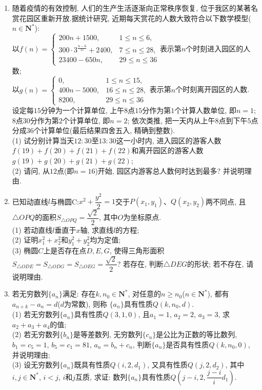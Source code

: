 \documentclass[10pt,a4paper]{article}
\begin{document}
\begin{enumerate}[1.]
\item 随着疫情的有效控制, 人们的生产生活逐渐向正常秩序恢复, 位于我区的某著名赏花园区重新开放.据统计研究, 近期每天赏花的人数大致符合以下数学模型($n\in \mathbf{N}^*$):\\
以$f(n)=\begin{cases}
200n+1500, & 1\le n\le 6,  \\ 300\cdot 3^{\frac{n-6}{11}}+2400, & 7\le n\le 28,  \\ 23400-650n, & 29\le n\le 36 \end{cases}$表示第$n$个时刻进入园区的人数;\\
以$g(n)=\begin{cases}
0, & 1\le n\le 15,  \\ 400n-5000, & 16\le n\le 28,  \\ 8200, & 29\le n\le 36  \end{cases}$表示第$n$个时刻离开园区的人数.\\
设定每$15$分钟为一个计算单位, 上午$8$点$15$分作为第$1$个计算人数单位, 即$n=1$; $8$点$30$分作为第$2$个计算单位, 即$n=2$; 依次类推, 把一天内从上午$8$点到下午$5$点分成$36$个计算单位(最后结果四舍五入, 精确到整数).\\
(1) 试分别计算当天$12: 30$至$13: 30$这一小时内, 进入园区的游客人数$f(19)+f(20)+f(21)+f(22)$和离开园区的游客人数$g(19)+g(20)+g(21)+g(22)$;\\
(2) 请问, 从$12$点(即$n=16$)开始, 园区内游客总人数何时达到最多? 并说明理由.
\item 已知动直线$l$与椭圆C:$x^2+\dfrac{y^2}2=1$交于$P(x_1,y_1)$、$Q(x_2,y_2)$两不同点, 且$\triangle OPQ$的面积$S_{\triangle OPQ}=\dfrac{\sqrt 2}2$, 其中$O$为坐标原点.\\
(1) 若动直线$l$垂直于$x$轴, 求直线$l$的方程;\\
(2) 证明$x_1^2+x_2^2$和$y_1^2+y_2^2$均为定值;\\
(3) 椭圆$C$上是否存在点$D,E,G$, 使得三角形面积$S_{\triangle ODE}=S_{\triangle ODG}=S_{\triangle OEG}=\dfrac{\sqrt 2}2$? 若存在, 判断$\triangle DEG$的形状; 若不存在, 请说明理由.
\item 若无穷数列$\{a_n\}$满足: 存在$k,n_0\in \mathbf{N}^*$, 对任意的$n\ge n_0$($n\in \mathbf{N}^*$), 都有$a_{n+k}-a_n=d$($d$为常数), 则称 $\{a_n\}$具有性质$Q(k,n_0,d)$.\\
(1) 若无穷数列$\{a_n\}$具有性质$Q(3,1,0)$, 且$a_1=1$, $a_2=2$, $a_3=3$, 求$a_2+a_3+a_4$的值;\\
(2) 若无穷数列$\{b_n\}$是等差数列, 无穷数列$\{c_n\}$是公比为正数的等比数列, $b_1=c_5=1$, $b_5=c_1=81$, $a_n=b_n+c_n$, 判断$\{a_n\}$是否具有性质$Q(k,n_0,0)$, 并说明理由;\\
(3) 设无穷数列$\{a_n\}$既具有性质$Q(i,2,d_1)$, 又具有性质$Q(j,2,d_2)$, 其中$i,j\in \mathbf{N}^*$, $i<j$, $i$和$j$互质, 求证: 数列$\{a_n\}$具有性质$Q(j-i,2,\dfrac{j-i}id_1)$.


\end{enumerate}
\end{document}
